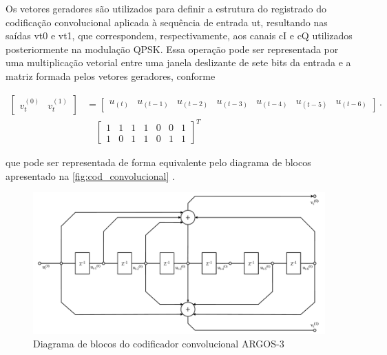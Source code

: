 Os vetores geradores são utilizados para definir a estrutura do registrado do codificação convolucional aplicada à sequência de entrada \gls{ut}, resultando nas saídas \gls{vt0} e \gls{vt1}, que correspondem, respectivamente, aos canais \gls{cI} e \gls{cQ} utilizados posteriormente na modulação \gls{QPSK}. Essa operação pode ser representada por uma multiplicação vetorial entre uma janela deslizante de sete bits da entrada e a matriz formada pelos vetores geradores, conforme

\begin{equation}
\begin{aligned}
    \begin{bmatrix}
        v_t^{(0)} & v_t^{(1)}
    \end{bmatrix}
    &=
    \begin{bmatrix}
        u_{(t)} & u_{(t-1)} & u_{(t-2)} & u_{(t-3)} & u_{(t-4)} & u_{(t-5)} & u_{(t-6)}
    \end{bmatrix} \cdot \\
    &\quad
    \begin{bmatrix}
        1 & 1 & 1 & 1 & 0 & 0 & 1 \\
        1 & 0 & 1 & 1 & 0 & 1 & 1
    \end{bmatrix}^{T}
\end{aligned}
\label{eq:matriz_geradora}
\end{equation}

\noindent que pode ser representada de forma equivalente pelo diagrama de blocos apresentado na \autoref{fig:cod_convolucional} \cite{cnes_services_and_message_formats_ed2_rev2_2006}.

\begin{figure}[ht]
	\centering
	\caption{Diagrama de blocos do codificador convolucional ARGOS-3}
	\label{fig:cod_convolucional}
	\includegraphics[width=\linewidth]{assets/cod_convolucional.pdf}
\end{figure}


